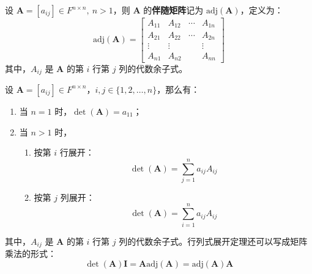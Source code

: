\begin{definition}
    设 $\mathbf{A} = [a_{ij}] \in F^{n \times n},\ n > 1$，则 $\mathbf{A}$ 的\textbf{伴随矩阵}记为 $\mathrm{adj}(\mathbf{A})$，定义为：
    \[
        \mathrm{adj}(\mathbf{A}) = \begin{bmatrix} A_{11} & A_{12} & \cdots & A_{1 n} \\ A_{21} & A_{22} & \cdots & A_{2 n} \\ \vdots & \vdots & & \vdots \\ A_{n 1} & A_{n 2} & & A_{n n} \end{bmatrix}
    \]
    其中，$A_{ij}$ 是 $\mathbf{A}$ 的第 $i$ 行第 $j$ 列的代数余子式。
    \label{def:adjugate_matrix}
\end{definition}

\begin{theorem}[行列式展开定理]
    设 $\mathbf{A} = [a_{ij}] \in F^{n \times n}$，$i,j\in\{1,2,\ldots,n\}$，那么有：
    \begin{enumerate}
        \item 当 $n=1$ 时，$\det(\mathbf{A}) = a_{11}$；
        \item 当 $n>1$ 时，
        \begin{enumerate}
            \item 按第 $i$ 行展开：
            \[
                \det(\mathbf{A}) = \sum_{j=1}^{n} a_{ij} A_{ij}
            \]
            \item 按第 $j$ 列展开：
            \[
                \det(\mathbf{A}) = \sum_{i=1}^{n} a_{ij} A_{ij}
            \]
        \end{enumerate}
    \end{enumerate}
    其中，$A_{ij}$ 是 $\mathbf{A}$ 的第 $i$ 行第 $j$ 列的代数余子式。行列式展开定理还可以写成矩阵乘法的形式：
    \[
        \det(\mathbf{A}) \mathbf{I} = \mathbf{A}\mathrm{adj}(\mathbf{A})= \mathrm{adj}(\mathbf{A})\mathbf{A}
    \]
    \label{thm:determinant_expansion}
\end{theorem}

